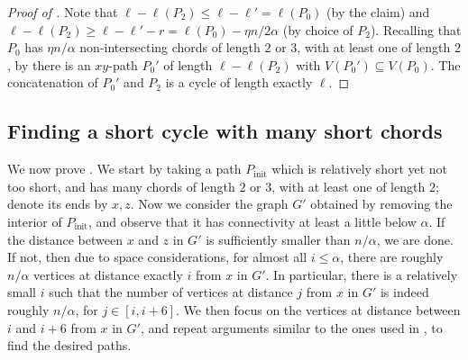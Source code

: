 \documentclass[11pt,english]{article}
\theoremstyle{plain}
\theoremstyle{definition}
\theoremstyle{remark}
\begin{document}
\begin{proof}[Proof of ]
			Note that $\ell - \ell(P_2) \le \ell - \ell' = \ell(P_0)$ (by the claim) and $\ell - \ell(P_2) \ge \ell - \ell' - r = \ell(P_0) - \eta n / 2\alpha$ (by choice of $P_2$).
			Recalling that $P_0$ has $\eta n / \alpha$ non-intersecting chords of length $2$ or $3$, with at least one of length $2$, by  there is an $xy$-path $P_0'$ of length $\ell - \ell(P_2)$ with $V(P_0') \subseteq V(P_0)$. The concatenation of $P_0'$ and $P_2$ is a cycle of length exactly $\ell$.
		\end{proof}

	\subsection{Finding a short cycle with many short chords}
		\def \Pi {P_{\mathrm{init}}}

		We now prove . We start by taking a path $\Pi$ which is relatively short yet not too short, and has many chords of length $2$ or $3$, with at least one of length $2$; denote its ends by $x,z$.
		Now we consider the graph $G'$ obtained by removing the interior of $\Pi$, and observe that it has connectivity at least a little below $\alpha$. If the distance between $x$ and $z$ in $G'$ is sufficiently smaller than $n/\alpha$, we are done. If not, then due to space considerations, for almost all $i \le \alpha$, there are roughly $n/\alpha$ vertices at distance exactly $i$ from $x$ in $G'$. In particular, there is a relatively small $i$ such that the number of vertices at distance $j$ from $x$ in $G'$ is indeed roughly $n/\alpha$, for $j \in [i, i+6]$. We then focus on the vertices at distance between $i$ and $i+6$ from $x$ in $G'$, and repeat arguments similar to the ones used in , to find the desired paths.
\end{document}
